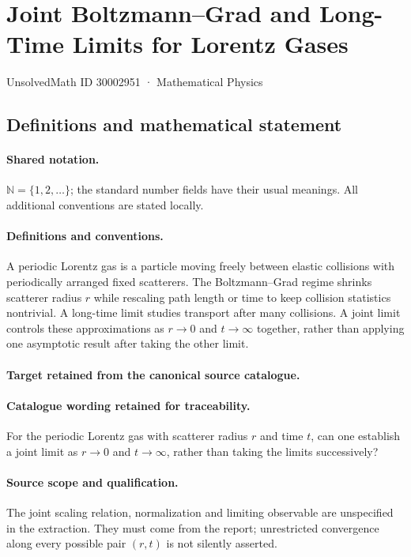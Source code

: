 \documentclass[11pt]{article}
\begin{document}
\setcounter{section}{30002950}
\section{Joint Boltzmann–Grad and Long-Time Limits for Lorentz Gases}\label{30002951}
{\small UnsolvedMath ID 30002951 · Mathematical Physics}
\subsection{Definitions and mathematical statement}

\paragraph{Shared notation.}$\mathbb N=\{1,2,\ldots\}$; the standard number fields have their usual meanings. All additional conventions are stated locally.


\paragraph{Definitions and conventions.}
A periodic Lorentz gas is a particle moving freely between elastic collisions with periodically arranged fixed scatterers. The Boltzmann--Grad regime shrinks scatterer radius $r$ while rescaling path length or time to keep collision statistics nontrivial. A long-time limit studies transport after many collisions. A joint limit controls these approximations as $r\to0$ and $t\to\infty$ together, rather than applying one asymptotic result after taking the other limit.

\paragraph{Target retained from the canonical source catalogue.}
\paragraph{Catalogue wording retained for traceability.}
For the periodic Lorentz gas with scatterer radius $r$ and time $t$, can one establish a joint limit as $r\to0$ and $t\to\infty$, rather than taking the limits successively?

\paragraph{Source scope and qualification.}
The joint scaling relation, normalization and limiting observable are unspecified in the extraction. They must come from the report; unrestricted convergence along every possible pair $(r,t)$ is not silently asserted.
\end{document}
